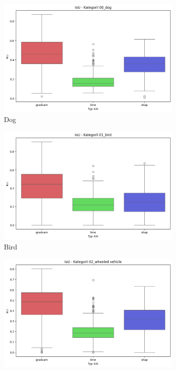 \begin{figure}
	\centering
	\begin{subfigure}[b]{0.3\textwidth}
		\includegraphics[width=.9\textwidth]{img/base_iou_dog}
		\caption{Dog}  \label{rys:base_iou_dog}
	\end{subfigure}
	\begin{subfigure}[b]{0.3\textwidth}
		\centering\includegraphics[width=.9\textwidth]{img/base_iou_bird}
		\caption{Bird}  \label{rys:base_iou_bird}
	\end{subfigure}
	\begin{subfigure}[b]{0.3\textwidth}
		\centering\includegraphics[width=.9\textwidth]{img/base_iou_vehicle}

\end{subfigure}
\end{figure}

